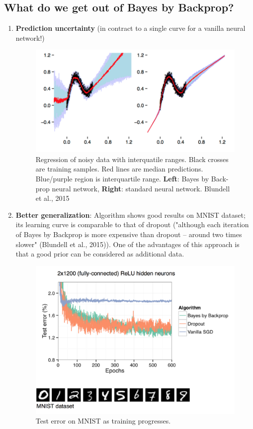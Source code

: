 \documentclass[main]{subfiles}
\begin{document}
\subsection{What do we get out of Bayes by Backprop?}
\begin{enumerate}
    \item \textbf{Prediction uncertainty} (in contract to a single curve for a vanilla neural network!)
    \begin{figure}[H]
    	\centering
    	\includegraphics[width=0.9\linewidth]{05_LearningAsBayesianInference/figures/BBB_vanillaNN.png}
    	\caption{Regression of noisy data with interquatile ranges. Black crosses are training samples. Red lines are median predictions. Blue/purple region is interquartile range. \textbf{Left}: Bayes by Back- prop neural network, \textbf{Right}: standard neural network. Blundell et al., 2015} 
    	\label{fig:bbb_vanillaNN}
    \end{figure}
    
    \item \textbf{Better generalization}: Algorithm shows good results on MNIST dataset; its learning curve is comparable to that of dropout ("although each iteration of Bayes by Backprop is more expensive than dropout – around two times slower" (Blundell et al., 2015)). One of the advantages of this approach is that a good prior can be considered as additional data.
    \begin{figure}[H]
    	\centering
    	\includegraphics[width=0.9\linewidth]{05_LearningAsBayesianInference/figures/learningcurve_bbb.png}
    	\caption{Test error on MNIST as training progresses.} 
    	\label{fig:bbb_testerror}
    \end{figure}
    

\end{enumerate}
\end{document}

